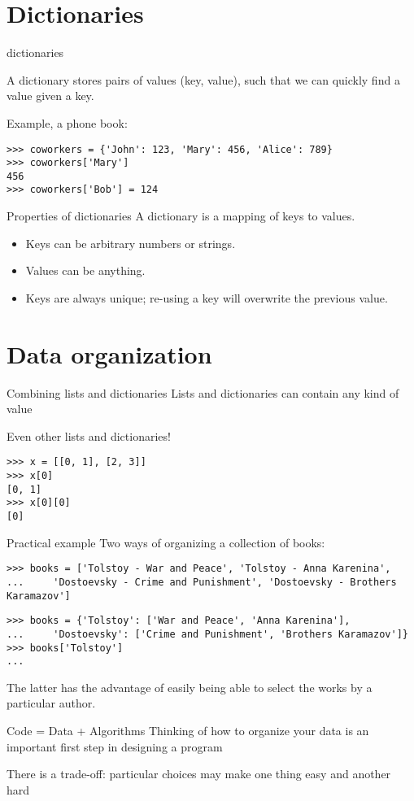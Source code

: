 \documentclass[aspectratio=169,usenames,dvipsnames]{beamer}
\begin{document}
\frame{\tableofcontents[currentsection]}
\section{Dictionaries}
\begin{frame}[fragile]{dictionaries}
    \begin{definition}
        A dictionary stores pairs of values (key, value),
        such that we can quickly find a value given a key.
    \end{definition}
Example, a phone book:
\begin{lstlisting}
>>> coworkers = {'John': 123, 'Mary': 456, 'Alice': 789}
>>> coworkers['Mary']
456
>>> coworkers['Bob'] = 124
\end{lstlisting}
\end{frame}

\begin{frame}{Properties of dictionaries}
A dictionary is a mapping of keys to values.

    \begin{itemize}
        \item Keys can be arbitrary numbers or strings.
        \item Values can be anything.
        \item Keys are always unique;
            re-using a key will overwrite the previous value.
    \end{itemize}
\end{frame}



\frame{\tableofcontents[currentsection]}
\section{Data organization}
\begin{frame}[fragile]{Combining lists and dictionaries}
Lists and dictionaries can contain any kind of value

Even other lists and dictionaries!

\begin{lstlisting}
>>> x = [[0, 1], [2, 3]]
>>> x[0]
[0, 1]
>>> x[0][0]
[0]
\end{lstlisting}
\end{frame}

\begin{frame}[fragile]{Practical example}
Two ways of organizing a collection of books:
\begin{lstlisting}
>>> books = ['Tolstoy - War and Peace', 'Tolstoy - Anna Karenina',
...     'Dostoevsky - Crime and Punishment', 'Dostoevsky - Brothers Karamazov']
\end{lstlisting}

\pause
\begin{lstlisting}
>>> books = {'Tolstoy': ['War and Peace', 'Anna Karenina'],
...     'Dostoevsky': ['Crime and Punishment', 'Brothers Karamazov']}
>>> books['Tolstoy']
...
\end{lstlisting}
The latter has the advantage of easily being able to
select the works by a particular author.
\end{frame}

\begin{frame}{Code = Data + Algorithms}
    Thinking of how to organize your data
    is an important first step in designing a program

    There is a trade-off:
    particular choices may make one thing easy and another hard
\end{frame}
\end{document}
